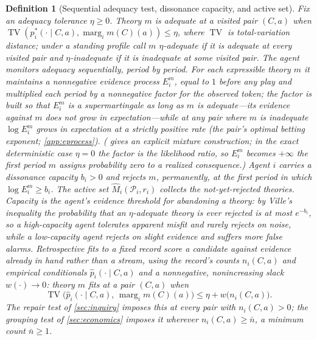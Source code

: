 \documentclass[11pt]{article}
\newtheorem{definition}[assumption]{Definition}
\theoremstyle{definition}
\newcommand{\TV}{\operatorname{TV}}
\newcommand{\marg}[1]{\operatorname{marg}_{#1}}
\begin{document}
\begin{definition}[Sequential adequacy test, dissonance capacity, and active set]
\label{def:test}
Fix an adequacy tolerance $\eta\ge0$.
Theory $m$ is \emph{adequate} at a visited pair $(C,a)$ when $\TV\!\left(p_i^{*}(\cdot\mid C,a),\marg{i}m(C)(a)\right)\le\eta$, where $\TV$ is total-variation distance; under a standing profile call $m$ \emph{$\eta$-adequate} if it is adequate at every visited pair and \emph{$\eta$-inadequate} if it is inadequate at some visited pair.
The agent monitors adequacy \emph{sequentially}, period by period.
For each expressible theory $m$ it maintains a nonnegative \emph{evidence process} $E_i^{m}$, equal to $1$ before any play and multiplied each period by a nonnegative factor for the observed token; the factor is built so that $E_i^{m}$ is a supermartingale as long as $m$ is adequate---its evidence against $m$ does not grow in expectation---while at any pair where $m$ is inadequate $\log E_i^{m}$ grows in expectation at a strictly positive rate (the pair's optimal betting exponent; \cref{app:eprocess}).
( gives an explicit mixture construction; in the exact deterministic case $\eta=0$ the factor is the likelihood ratio, so $E_i^{m}$ becomes $+\infty$ the first period $m$ assigns probability zero to a realized consequence.)
Agent $i$ carries a \emph{dissonance capacity} $b_i>0$ and \emph{rejects} $m$, permanently, at the first period in which $\log E_i^{m}\ge b_i$.
The \emph{active set} $\widehat M_i(\mathcal P_i,r_i)$ collects the not-yet-rejected theories.
Capacity is the agent's evidence threshold for abandoning a theory: by Ville's inequality the probability that an $\eta$-adequate theory is ever rejected is at most $e^{-b_i}$, so a high-capacity agent tolerates apparent misfit and rarely rejects on noise, while a low-capacity agent rejects on slight evidence and suffers more false alarms.
Retrospective fits to a \emph{fixed} record score a candidate against evidence already in hand rather than a stream, using the record's counts $n_i(C,a)$ and empirical conditionals $\hat p_i(\cdot\mid C,a)$ and a nonnegative, nonincreasing slack $w(\cdot)\to0$: theory $m$ \emph{fits} at a pair $(C,a)$ when
\begin{equation}
\TV\bigl(\hat p_i(\cdot\mid C,a),\,\marg{i}m(C)(a)\bigr)
\le
\eta+w\bigl(n_i(C,a)\bigr).
\label{eq:test}
\end{equation}
The repair test of \cref{sec:inquiry} imposes this at every pair with $n_i(C,a)>0$; the grouping test of \cref{sec:economics} imposes it wherever $n_i(C,a)\ge\bar n$, a minimum count $\bar n\ge1$.
\end{definition}
\end{document}
